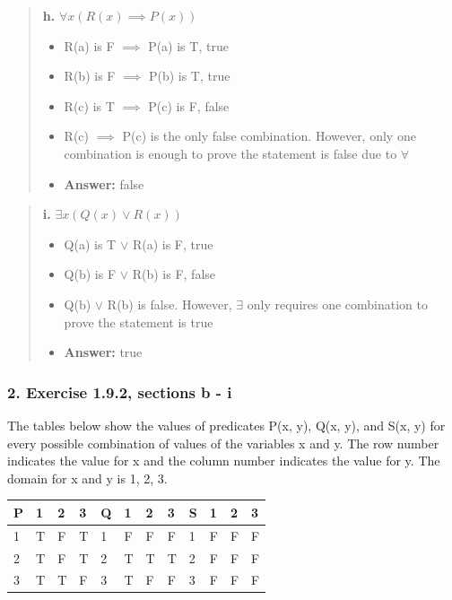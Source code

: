 \documentclass[11pt, oneside]{article}
\begin{document}
\pagebreak

\begin{quote}
    \textbf{h. }$\forall x (R(x) \implies P(x))$

    \begin{itemize}
        \item R(a) is F $\implies$ P(a) is T, true
        \item R(b) is F $\implies$ P(b) is T, true
        \item R(c) is T $\implies$ P(c) is F, false
        \item R(c) $\implies$ P(c) is the only false combination. However, only one combination is enough to prove the statement is false due to $\forall$
        \item \textbf{Answer:} false
    \end{itemize}
\end{quote}

\begin{quote}
    \textbf{i. }$\exists x (Q(x) \lor R(x))$

    \begin{itemize}
        \item Q(a) is T $\lor$ R(a) is F, true
        \item Q(b) is F $\lor$ R(b) is F, false
        \item Q(b) $\lor$ R(b) is false. However, $\exists$ only requires one combination to prove the statement is true
        \item \textbf{Answer:} true
    \end{itemize}
\end{quote}

\subsubsection*{2. Exercise 1.9.2, sections b - i}

The tables below show the values of predicates P(x, y), Q(x, y), and S(x, y) for every possible combination of values of the variables x and y. The row number indicates the value for x and the column number indicates the value for y. The domain for x and y is {1, 2, 3}.

\begin{tabular}{ |p{0.5cm}|p{0.5cm}|p{0.5cm}|p{0.5cm}||p{0.5cm}|p{0.5cm}|p{0.5cm}|p{0.5cm}||p{0.5cm}|p{0.5cm}|p{0.5cm}|p{0.5cm}|  }
    \hline
    P & 1 & 2 & 3 & Q & 1 & 2 & 3 & S & 1 & 2 & 3 \\
    \hline
    1 & T & F & T & 1 & F & F & F & 1 & F & F & F \\
    2 & T & F & T & 2 & T & T & T & 2 & F & F & F \\
    3 & T & T & F & 3 & T & F & F & 3 & F & F & F \\
    \hline
\end{tabular}
\end{document}
